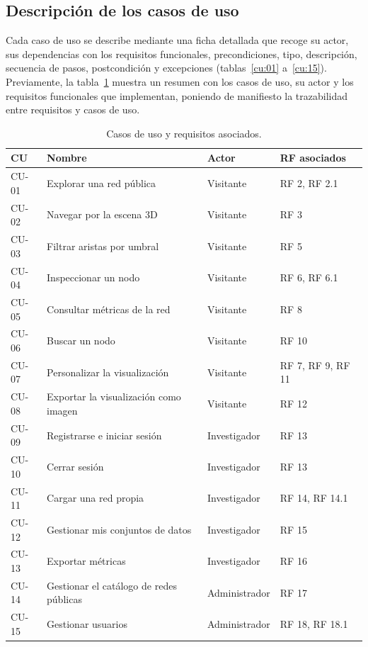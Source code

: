 \subsection{Descripción de los casos de uso}

Cada caso de uso se describe mediante una ficha detallada que recoge su actor, sus dependencias con
los requisitos funcionales, precondiciones, tipo, descripción, secuencia de pasos, postcondición y
excepciones (tablas~\ref{cu:01} a~\ref{cu:15}). Previamente, la tabla~\ref{tab:cu-resumen} muestra un
resumen con los casos de uso, su actor y los requisitos funcionales que implementan, poniendo de
manifiesto la trazabilidad entre requisitos y casos de uso.

\begin{table}[H]
	\centering
	\caption{Casos de uso y requisitos asociados.}
	\label{tab:cu-resumen}
	\small
	\begin{tabularx}{\textwidth}{>{\centering\arraybackslash}p{1.3cm} >{\raggedright\arraybackslash}X >{\raggedright\arraybackslash}p{2.5cm} >{\raggedright\arraybackslash}p{2.7cm}}
		\toprule
		\textbf{CU} & \textbf{Nombre} & \textbf{Actor} & \textbf{RF asociados} \\
		\midrule
		CU-01 & Explorar una red pública & Visitante & RF 2, RF 2.1 \\
		CU-02 & Navegar por la escena 3D & Visitante & RF 3 \\
		CU-03 & Filtrar aristas por umbral & Visitante & RF 5 \\
		CU-04 & Inspeccionar un nodo & Visitante & RF 6, RF 6.1 \\
		CU-05 & Consultar métricas de la red & Visitante & RF 8 \\
		CU-06 & Buscar un nodo & Visitante & RF 10 \\
		CU-07 & Personalizar la visualización & Visitante & RF 7, RF 9, RF 11 \\
		CU-08 & Exportar la visualización como imagen & Visitante & RF 12 \\
		\addlinespace
		CU-09 & Registrarse e iniciar sesión & Investigador & RF 13 \\
		CU-10 & Cerrar sesión & Investigador & RF 13 \\
		CU-11 & Cargar una red propia & Investigador & RF 14, RF 14.1 \\
		CU-12 & Gestionar mis conjuntos de datos & Investigador & RF 15 \\
		CU-13 & Exportar métricas & Investigador & RF 16 \\
		\addlinespace
		CU-14 & Gestionar el catálogo de redes públicas & Administrador & RF 17 \\
		CU-15 & Gestionar usuarios & Administrador & RF 18, RF 18.1 \\
		\bottomrule
	\end{tabularx}
\end{table}

